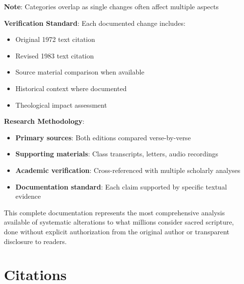 \documentclass[11pt,twoside]{book}
\begin{document}
\textbf{\textbf{Note}}: Categories overlap as single changes often affect multiple aspects

\textbf{\textbf{Verification Standard}}: Each documented change includes:
\begin{itemize}
\item Original 1972 text citation
\item Revised 1983 text citation
\item Source material comparison when available
\item Historical context where documented
\item Theological impact assessment
\end{itemize}

\textbf{\textbf{Research Methodology}}: 
\begin{itemize}
\item \textbf{\textbf{Primary sources}}: Both editions compared verse-by-verse
\item \textbf{\textbf{Supporting materials}}: Class transcripts, letters, audio recordings
\item \textbf{\textbf{Academic verification}}: Cross-referenced with multiple scholarly analyses
\item \textbf{\textbf{Documentation standard}}: Each claim supported by specific textual evidence
\end{itemize}

This complete documentation represents the most comprehensive analysis available of systematic alterations to what millions consider sacred scripture, done without explicit authorization from the original author or transparent disclosure to readers.
\part*{Citations}
\label{sec:org4fc1496}
\thispagestyle{chapterpage}
\end{document}
